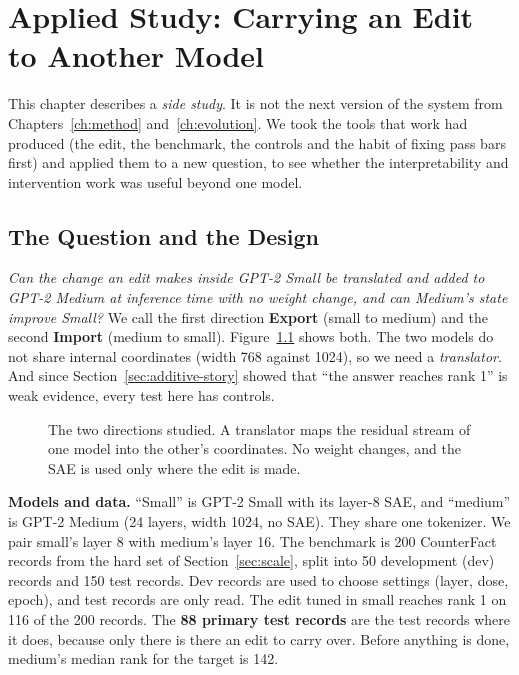 \chapter{Applied Study: Carrying an Edit to Another Model}\label{ch:transfer}

This chapter describes a \emph{side study}. It is not the next version of the system from Chapters~\ref{ch:method} and~\ref{ch:evolution}. We took the tools that work had produced (the edit, the benchmark, the controls and the habit of fixing pass bars first) and applied them to a new question, to see whether the interpretability and intervention work was useful beyond one model.

\section{The Question and the Design}

\textit{Can the change an edit makes inside GPT-2 Small be translated and added to GPT-2 Medium at inference time with no weight change, and can Medium's state improve Small?} We call the first direction \textbf{Export} (small to medium) and the second \textbf{Import} (medium to small). Figure~\ref{fig:overview} shows both. The two models do not share internal coordinates (width 768 against 1024), so we need a \emph{translator}. And since Section~\ref{sec:additive-story} showed that ``the answer reaches rank 1'' is weak evidence, every test here has controls.

\begin{figure}[t]
\centering
{}
\caption{The two directions studied. A translator maps the residual stream of one model into the other's coordinates. No weight changes, and the SAE is used only where the edit is made.}\label{fig:overview}
\end{figure}

\textbf{Models and data.} ``Small'' is GPT-2 Small with its layer-8 SAE, and ``medium'' is GPT-2 Medium (24 layers, width 1024, no SAE). They share one tokenizer. We pair small's layer 8 with medium's layer 16. The benchmark is 200 CounterFact records from the hard set of Section~\ref{sec:scale}, split into 50 development (dev) records and 150 test records. Dev records are used to choose settings (layer, dose, epoch), and test records are only read. The edit tuned in small reaches rank 1 on 116 of the 200 records. The \textbf{88 primary test records} are the test records where it does, because only there is there an edit to carry over. Before anything is done, medium's median rank for the target is 142.

